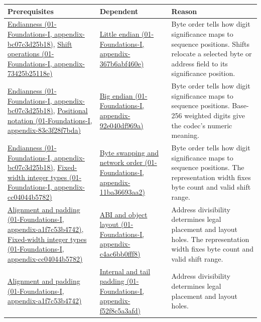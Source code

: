 {\def\LTcaptype{none} %
\begin{longtable}[]{@{}
  >{\raggedright\arraybackslash}p{}
  >{\raggedright\arraybackslash}p{}
  >{\raggedright\arraybackslash}p{}@{}}
\toprule\noalign{}
\begin{minipage}[b]{\linewidth}\raggedright
Prerequisites
\end{minipage} & \begin{minipage}[b]{\linewidth}\raggedright
Dependent
\end{minipage} & \begin{minipage}[b]{\linewidth}\raggedright
Reason
\end{minipage} \\
\midrule\noalign{}
\endhead
\bottomrule\noalign{}
\endlastfoot
\href{}{Endianness (01-Foundations-I, appendix-bc07c3d25b18)}, \href{}{Shift operations (01-Foundations-I, appendix-73425b25118e)} & \href{}{Little endian (01-Foundations-I, appendix-367b6abf460e)} & Byte order tells how digit significance maps to sequence positions. Shifts relocate a selected byte or address field to its significance position. \\
\href{}{Endianness (01-Foundations-I, appendix-bc07c3d25b18)}, \href{}{Positional notation (01-Foundations-I, appendix-83c3f28f7bda)} & \href{}{Big endian (01-Foundations-I, appendix-92e040df969a)} & Byte order tells how digit significance maps to sequence positions. Base-256 weighted digits give the codec's numeric meaning. \\
\href{}{Endianness (01-Foundations-I, appendix-bc07c3d25b18)}, \href{}{Fixed-width integer types (01-Foundations-I, appendix-cc04044b5782)} & \href{}{Byte swapping and network order (01-Foundations-I, appendix-11ba36693aa2)} & Byte order tells how digit significance maps to sequence positions. The representation width fixes byte count and valid shift range. \\
\href{}{Alignment and padding (01-Foundations-I, appendix-a1f7c53b4742)}, \href{}{Fixed-width integer types (01-Foundations-I, appendix-cc04044b5782)} & \href{}{ABI and object layout (01-Foundations-I, appendix-c4ac6bb0fff8)} & Address divisibility determines legal placement and layout holes. The representation width fixes byte count and valid shift range. \\
\href{}{Alignment and padding (01-Foundations-I, appendix-a1f7c53b4742)} & \href{}{Internal and tail padding (01-Foundations-I, appendix-f52f8c5a3afd)} & Address divisibility determines legal placement and layout holes. \\

\end{longtable}}
